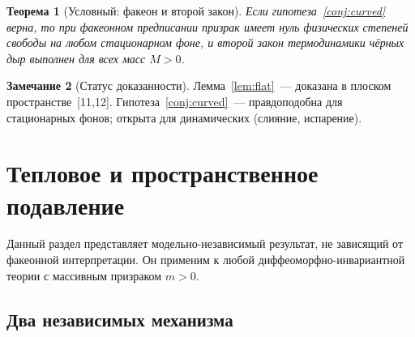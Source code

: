 \documentclass[12pt,a4paper]{article}
\theoremstyle{plain}
\newtheorem{theorem}{Теорема}[section]
\theoremstyle{definition}
\newtheorem{remark}[theorem]{Замечание}
\begin{document}
\begin{theorem}[Условный: факеон и второй закон]\label{th:fakeon_2nd}
Если гипотеза~\ref{conj:curved} верна, то при факеонном предписании
призрак имеет нуль физических степеней свободы на \emph{любом}
стационарном фоне, и второй закон термодинамики чёрных дыр
выполнен для всех масс $M > 0$.
\end{theorem}

\begin{remark}[Статус доказанности]
Лемма~\ref{lem:flat}~--- доказана в плоском пространстве~[11,12].
Гипотеза~\ref{conj:curved}~--- правдоподобна для стационарных фонов;
открыта для динамических (слияние, испарение).
\end{remark}

\section{Тепловое и пространственное подавление}\label{sec:suppression}

Данный раздел представляет модельно-независимый результат, не
зависящий от факеонной интерпретации. Он применим к любой
диффеоморфно-инвариантной теории с массивным призраком $m > 0$.

\subsection{Два независимых механизма}
\end{document}

